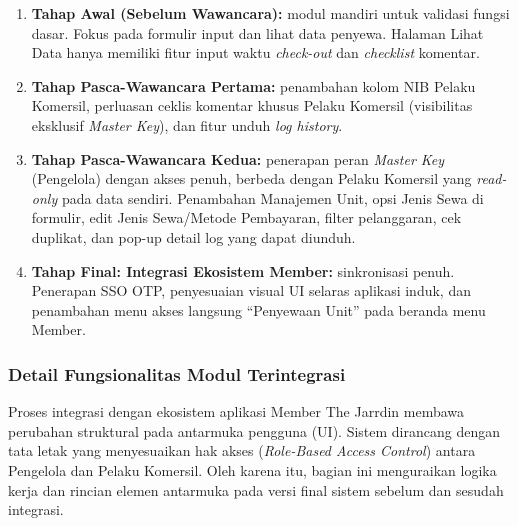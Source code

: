 \begin{enumerate}[label=\Alph*.]
    \item \textbf{Tahap Awal (Sebelum Wawancara):} modul mandiri untuk validasi fungsi dasar. Fokus pada formulir {input} dan lihat data penyewa. Halaman Lihat Data hanya memiliki fitur input waktu \textit{check-out} dan \textit{checklist} komentar.
    \item \textbf{Tahap Pasca-Wawancara Pertama:} penambahan kolom NIB Pelaku Komersil, perluasan ceklis komentar khusus Pelaku Komersil (visibilitas eksklusif \textit{Master Key}), dan fitur unduh \textit{log history}.
    \item \textbf{Tahap Pasca-Wawancara Kedua:} penerapan peran \textit{Master Key} (Pengelola) dengan akses penuh, berbeda dengan Pelaku Komersil yang \textit{read-only} pada data sendiri. Penambahan Manajemen Unit, opsi Jenis Sewa di formulir, edit Jenis Sewa/Metode Pembayaran, filter pelanggaran, cek duplikat, dan {pop-up} detail log yang dapat diunduh.
    \item \textbf{Tahap Final: Integrasi Ekosistem Member:} sinkronisasi penuh. Penerapan SSO OTP, penyesuaian visual UI selaras aplikasi induk, dan penambahan menu akses langsung ``Penyewaan Unit'' pada beranda menu {Member}.
\end{enumerate}



\subsubsection{Detail Fungsionalitas Modul Terintegrasi}
Proses integrasi dengan ekosistem aplikasi {Member} The Jarrdin membawa perubahan struktural pada antarmuka pengguna (UI). Sistem dirancang dengan tata letak yang menyesuaikan hak akses (\textit{Role-Based Access Control}) antara Pengelola dan Pelaku Komersil. Oleh karena itu, bagian ini menguraikan logika kerja dan rincian elemen antarmuka pada versi final sistem sebelum dan sesudah integrasi.


